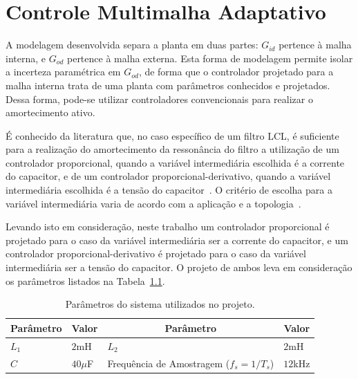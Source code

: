 
\chapter{Controle Multimalha Adaptativo}\label{controle}

	A modelagem desenvolvida separa a planta em duas partes: $G_{id}$ pertence à malha
    interna, e $G_{od}$ pertence à malha externa. Esta forma de modelagem permite isolar
    a incerteza paramétrica em $G_{od}$, de forma que o controlador projetado para a
    malha interna trata de uma planta com parâmetros conhecidos e projetados. Dessa forma,
    pode-se utilizar controladores convencionais para realizar o amortecimento ativo.

    É conhecido da literatura que, no caso específico de um filtro LCL, é suficiente
    para a realização do amortecimento da ressonância do filtro a utilização de um
    controlador proporcional, quando a variável intermediária escolhida é a corrente do
    capacitor, e de um controlador proporcional-derivativo, quando a variável intermediária
    escolhida é a tensão do capacitor~\cite{ref:DANNEHL}. O critério de escolha para a
    variável intermediária varia de acordo com a aplicação e a topologia~\cite{ref:POH}.

    Levando isto em consideração, neste trabalho um controlador proporcional é projetado
    para o caso da variável intermediária ser a corrente do capacitor, e um controlador
    proporcional-derivativo é projetado para o caso da variável intermediária ser a
    tensão do capacitor. O projeto de ambos leva em consideração os parâmetros listados
    na Tabela~\ref{tab:sim_parameters}.

    \begin{table}[htb]
        \renewcommand{\arraystretch}{1.35}
        \setlength{\tabcolsep}{1.2mm}
        \caption{Parâmetros do sistema utilizados no projeto.}
        \label{tab:sim_parameters}
        \centering
        \begin{tabular}{l l l l}
            \hline
            \multicolumn{1}{c}{Parâmetro} & \multicolumn{1}{c}{Valor} &
            \multicolumn{1}{c}{Parâmetro} & \multicolumn{1}{c}{Valor} \\
            \hline
            $L_1$ &  $2$mH      &  $L_2$                                   &  $2$mH    \\
            $C$   &  $40\mu$F   & Frequência de Amostragem ($f_s = 1/T_s$) &  $12$kHz  \\
            \hline
        \end{tabular}
    \end{table}


